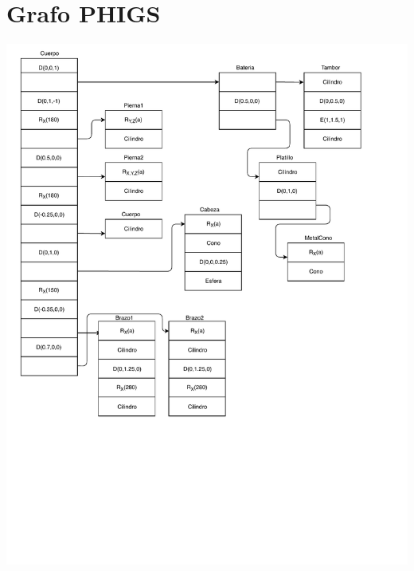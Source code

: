 \documentclass[11pt]{article}
\begin{document}
\section{Grafo PHIGS}
\includegraphics[scale=0.8]{PHIGS.pdf}
\end{document}
